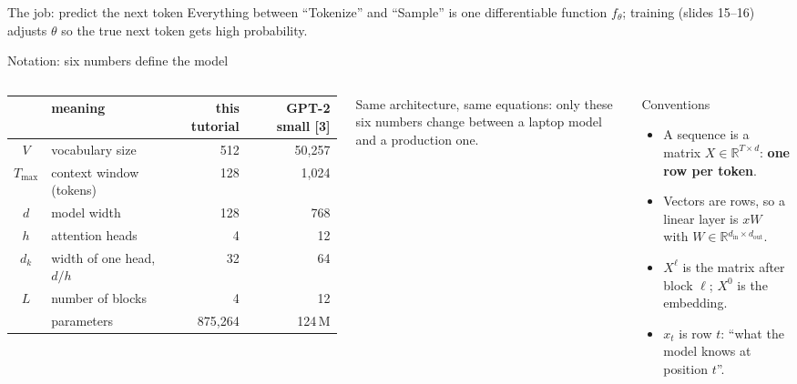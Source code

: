 \documentclass[aspectratio=169,10pt]{beamer}
\newcommand{\R}{\mathbb{R}}
\renewcommand{\cite}[1]{{\scriptsize\color{cTok}[#1]}}
\begin{document}
\begin{frame}{The job: predict the next token}
\vspace{1mm}
{\small Everything between ``Tokenize'' and ``Sample'' is one differentiable function $f_\theta$;
training (slides 15--16) adjusts $\theta$ so the true next token gets high probability.}
\end{frame}

\begin{frame}{Notation: six numbers define the model}
\begin{columns}[T,onlytextwidth]
\small
\renewcommand{\arraystretch}{1.18}
\begin{tabular}{@{}clrr@{}}
\toprule
 & meaning & \textbf{this tutorial} & GPT-2 small \cite{3}\\
\midrule
$V$ & vocabulary size & 512 & 50{,}257\\
$T_{\max}$ & context window (tokens) & 128 & 1{,}024\\
$d$ & model width & 128 & 768\\
$h$ & attention heads & 4 & 12\\
$d_k$ & width of one head, $d/h$ & 32 & 64\\
$L$ & number of blocks & 4 & 12\\
\midrule
 & parameters & 875{,}264 & 124\,M\\
\bottomrule
\end{tabular}

\vspace{2.5mm}
Same architecture, same equations: only these six numbers change between a laptop
model and a production one.
\begin{block}{Conventions}
\small
\begin{itemize}
  \item A sequence is a matrix $X\in\R^{T\times d}$: \textbf{one row per token}.
  \item Vectors are rows, so a linear layer is $xW$ with $W\in\R{}^{d_\text{in}\times d_\text{out}}$.
  \item $X^{\ell}$ is the matrix after block $\ell$; $X^{0}$ is the embedding.
  \item $x_t$ is row $t$: ``what the model knows at position $t$''.
\end{itemize}
\end{block}
\vspace{-1mm}
\end{columns}
\end{frame}
\end{document}

